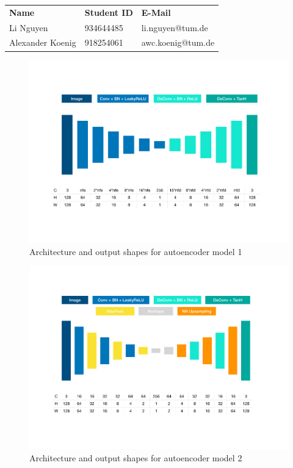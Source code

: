 \documentclass{article}
\begin{document}
\begin{table}[!h]
\center
\begin{tabular}{|l|l|l|}
\hline
\textbf{Name}             & \textbf{Student ID} & \textbf{E-Mail}            \\ \hhline{|=|=|=|}
Li Nguyen        & 934644485  & li.nguyen@tum.de  \\ \hline
Alexander Koenig & 918254061  & awc.koenig@tum.de \\ \hline
\end{tabular}
\end{table}

\begin{figure}[h!]
	\centering 
	\includegraphics[width=0.9\linewidth]{figures/ae_1}
	\caption{Architecture and output shapes for autoencoder model 1}
	\label{fig:model1}
\end{figure}

\begin{figure}[t!]
	\centering 
	\includegraphics[width=0.9\linewidth]{figures/ae_2}
	\caption{Architecture and output shapes for autoencoder model 2}
	\label{fig:model2}
\end{figure}
\end{document}
